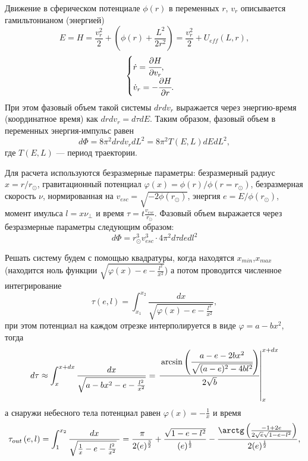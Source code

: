 Движение в сферическом потенциале $\phi(r)$ в переменных $r$, $v_r$ описывается гамильтонианом (энергией)
\begin{equation}
	\label{eq:move_hamiltonian}	
	E = H = \frac{v_{r}^{2}}{2} + \left( {\phi(r) + \frac{L^{2}}{2r^{2}}} \right) = \frac{v_{r}^{2}}{2} + U_{eff}(L,r),
\end{equation}
\begin{equation}
	\label{eq:move_equations}
	\begin{cases}
		\dot{r} = \cfrac{\partial H}{\partial v_r},\\
		\dot{v}_r= -\cfrac{\partial H}{\partial r}.
	\end{cases}
\end{equation}
При этом фазовый объем такой системы $drdv_r$ выражается через энергию-время (координатное время) как $drdv_r = d\tau dE$. Таким образом, фазовый объем в переменных энергия-импульс равен
\begin{equation}
	\label{eq:phase_volume_EL}
	d\Phi = 8\pi^{2}drdv_{r}dL^{2} = 8\pi^{2}T(E,L)dEdL^2,
\end{equation}
где $T(E,L)$ --- период траектории.

Для расчета используются безразмерные параметры: безразмерный радиус $x = r/r_{\odot}$, гравитационный потенциал $\varphi(x) = \phi(r)/\phi(r = r_{\odot})$, безразмерная скорость $\nu$, нормированная на $v_{esc} = \sqrt{-2\phi(r_{\odot})}$, энергия $e = E/\phi(r_{\odot})$, момент имульса $l = x \nu_{\perp}$ и время $\tau =  t \frac{v_{esc}}{r_{\odot}}$. Фазовый объем выражается через безразмерные параметры следующим образом:
\begin{equation}
	\label{eq:phase_volume_nd}
	d\Phi = r_{\odot}^3v_{esc}^3 \cdot 4\pi^{2} d\tau de dl^2
\end{equation}


Решать систему будем с помощью квадратуры, когда находятся $x_{min}$,$x_{max}$ (находится ноль функции  $\sqrt{\varphi(x) -e - \frac{l^{2}}{x^{2}}}$) а потом проводится численное интегрирование 
\begin{equation}
	\tau\left( {e,l} \right) = {\int_{x_{1}}^{x_{2}}\frac{dx}{ \sqrt{\varphi(x) -e - \frac{l^{2}}{x^{2}}}}},
\end{equation}
при этом потенциал на каждом отрезке интерполируется в виде $\varphi = a-bx^2$, тогда
\begin{equation}
	\label{eq:eval_dt}
	d\tau \approx \int_{x}^{x+dx}\frac{dx}{ \sqrt{a-bx^2 -e - \frac{l^{2}}{x^{2}}}} = \left.\cfrac{\arcsin\left(
			\cfrac{a-e-2bx^2}{\sqrt{(a-e)^2-4bl^2}}
			\right)}{2\sqrt{b}}\right\rvert_{x}^{x+dx}
\end{equation}
а снаружи небесного тела потенциал равен $\varphi(x) = - \frac{1}{x}$ и время
\begin{equation}
	\label{eq:tau_out_eq}
	\tau_{out}\left( {e,l} \right) = {\int_{1}^{x_{2}}\frac{dx}{\sqrt{\frac{1}{x} - e - \frac{l^{2}}{x^{2}}}~}} = \frac{\pi}{2(e)^{\frac{3}{2}}} + \frac{\sqrt{1 - e - l^{2}}}{(e)^{\frac{1}{2}}} - \frac{{\arctg}\left( \frac{- 1 + 2e}{2\sqrt{e}\sqrt{1 - e - l^{2}}} \right)}{2(e)^{\frac{1}{2}}},
\end{equation}

